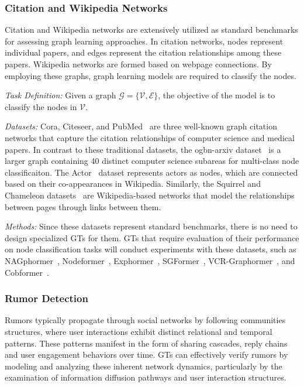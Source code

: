 \subsubsection{\textbf{Citation and Wikipedia Networks}}
Citation and Wikipedia networks are extensively utilized as standard benchmarks for assessing graph learning approaches. In citation networks, nodes represent individual papers, and edges represent the citation relationships among these papers. Wikipedia networks are formed based on webpage connections. By employing these graphs, graph learning models are required to classify the nodes.

\textit{Task Definition:}
Given a graph $\mathcal{G} = \{\mathcal{V}, \mathcal{E}\}$, the objective of the model is to classify the nodes in $\mathcal{V}$.

\textit{Datasets:}
Cora, Citeseer, and PubMed~\cite{sen2008collective} are three well-known graph citation networks that capture the citation relationships of computer science and medical papers. In contrast to these traditional datasets, 
the ogbn-arxiv dataset~\cite{hu2020open} is a larger graph containing 40 distinct computer science subareas for multi-class node classificaiton. 
The Actor~\cite{actor-dataset} dataset represents actors as nodes, which are connected based on their co-appearances in Wikipedia. Similarly, the Squirrel and Chameleon datasets~\cite{rozemberczki2021multiscale} are Wikipedia-based networks that model the relationships between pages through links between them.

\textit{Methods:} 
Since these datasets represent standard benchmarks, there is no need to design specialized GTs for them. GTs that require evaluation of their performance on node classification tasks will conduct experiments with these datasets, such as NAGphormer~\cite{NAGphormer}, Nodeformer~\cite{wu2022nodeformer}, Exphormer~\cite{shirzad2023exphormer}, SGFormer~\cite{wu2023sgformer}, VCR-Graphormer~\cite{fu2024vcrgraphormer}, and Cobformer~\cite{xing2024less}.


\subsubsection{\textbf{Rumor Detection}}
Rumors typically propagate through social networks by following communities structures, where user interactions exhibit distinct relational and temporal patterns. These patterns manifest in the form of sharing cascades, reply chains and user engagement behaviors over time. GTs can effectively verify rumors by modeling and analyzing these inherent network dynamics, particularly by the examination of information diffusion pathways and user interaction structures. 

